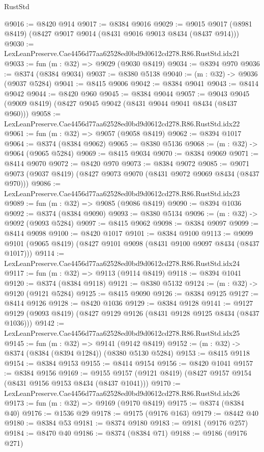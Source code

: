 \begin{lexlean}{RustStd}
\begin{coremodule}
@9016 := @8420 @914
@9017 := @8384 @9016
@9029 := @9015 @9017 (@8981 @8419) (@8427 @9017 @9014 (@8431 @9016 @9013 @8434 (@8437 @914)))
@9030 := LexLeanPreserve.Cae4456d77aa62528ed0bd9d0612cd278.R86.RustStd.idx21
@9033 := fun (m : @32) => @9029 (@9030 @8419)
@9034 := @8394 @970
@9036 := @8374 (@8384 @9034)
@9037 := @8380 @5138
@9040 := (m : @32) -> @9036 (@9037 @5284)
@9041 := @8415 @9006
@9042 := @8384 @9041
@9043 := @8414 @9042
@9044 := @8420 @960
@9045 := @8384 @9044
@9057 := @9043 @9045 (@9009 @8419) (@8427 @9045 @9042 (@8431 @9044 @9041 @8434 (@8437 @960)))
@9058 := LexLeanPreserve.Cae4456d77aa62528ed0bd9d0612cd278.R86.RustStd.idx22
@9061 := fun (m : @32) => @9057 (@9058 @8419)
@9062 := @8394 @1017
@9064 := @8374 (@8384 @9062)
@9065 := @8380 @5136
@9068 := (m : @32) -> @9064 (@9065 @5284)
@9069 := @8415 @9034
@9070 := @8384 @9069
@9071 := @8414 @9070
@9072 := @8420 @970
@9073 := @8384 @9072
@9085 := @9071 @9073 (@9037 @8419) (@8427 @9073 @9070 (@8431 @9072 @9069 @8434 (@8437 @970)))
@9086 := LexLeanPreserve.Cae4456d77aa62528ed0bd9d0612cd278.R86.RustStd.idx23
@9089 := fun (m : @32) => @9085 (@9086 @8419)
@9090 := @8394 @1036
@9092 := @8374 (@8384 @9090)
@9093 := @8380 @5134
@9096 := (m : @32) -> @9092 (@9093 @5284)
@9097 := @8415 @9062
@9098 := @8384 @9097
@9099 := @8414 @9098
@9100 := @8420 @1017
@9101 := @8384 @9100
@9113 := @9099 @9101 (@9065 @8419) (@8427 @9101 @9098 (@8431 @9100 @9097 @8434 (@8437 @1017)))
@9114 := LexLeanPreserve.Cae4456d77aa62528ed0bd9d0612cd278.R86.RustStd.idx24
@9117 := fun (m : @32) => @9113 (@9114 @8419)
@9118 := @8394 @1041
@9120 := @8374 (@8384 @9118)
@9121 := @8380 @5132
@9124 := (m : @32) -> @9120 (@9121 @5284)
@9125 := @8415 @9090
@9126 := @8384 @9125
@9127 := @8414 @9126
@9128 := @8420 @1036
@9129 := @8384 @9128
@9141 := @9127 @9129 (@9093 @8419) (@8427 @9129 @9126 (@8431 @9128 @9125 @8434 (@8437 @1036)))
@9142 := LexLeanPreserve.Cae4456d77aa62528ed0bd9d0612cd278.R86.RustStd.idx25
@9145 := fun (m : @32) => @9141 (@9142 @8419)
@9152 := (m : @32) -> @8374 (@8384 (@8394 @1284)) (@8380 @5130 @5284)
@9153 := @8415 @9118
@9154 := @8384 @9153
@9155 := @8414 @9154
@9156 := @8420 @1041
@9157 := @8384 @9156
@9169 := @9155 @9157 (@9121 @8419) (@8427 @9157 @9154 (@8431 @9156 @9153 @8434 (@8437 @1041)))
@9170 := LexLeanPreserve.Cae4456d77aa62528ed0bd9d0612cd278.R86.RustStd.idx26
@9173 := fun (m : @32) => @9169 (@9170 @8419)
@9175 := @8374 (@8384 @40)
@9176 := @1536 @29
@9178 := @9175 (@9176 @163)
@9179 := @8442 @40
@9180 := @8384 @53
@9181 := @8374 @9180
@9183 := @9181 (@9176 @257)
@9184 := @8470 @40
@9186 := @8374 (@8384 @71)
@9188 := @9186 (@9176 @271)

\end{coremodule}
\end{lexlean}

